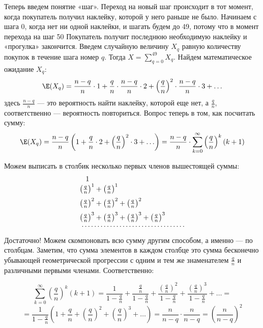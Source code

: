 \begin{enumerate}
Теперь введем понятие «шаг». Переход на новый шаг происходит в тот момент, когда покупатель получил наклейку, которой у него раньше не было. Начинаем с шага 0, когда нет ни одной наклейки, и шагать будем до 49, потому что в момент перехода на шаг 50 Покупатель получит последнюю необходимую наклейку и «прогулка» закончится. Введем случайную величину $X_q$ равную количеству покупок в течение шага номер $q$. Тогда $X = \sum \limits_{q=0}^{49}X_q$.  Найдем математическое ожидание $X_q$:
\[
\E(X_q) = \frac{n-q}{n}\cdot 1 + \frac{q}{n}\cdot\frac{n-q}{n}\cdot 2 + \left(\frac{q}{n}\right)^2\cdot\frac{n-q}{n}\cdot 3 + \ldots
\]
здесь $\frac{n-q}{n}$ —  это вероятность найти наклейку, которой еще нет, а $\frac{q}{n}$, соответственно — вероятность повториться. Вопрос теперь в том, как посчитать сумму:
\[
\E(X_q) = \frac{n-q}{n}\left( 1 + \frac{q}{n}\cdot 2 + \left(\frac{q}{n}\right)^2 \cdot 3 + \ldots\right) = \frac{n-q}{n}\cdot\sum\limits_{k=0}^{\infty}\left(\frac{q}{n}\right)^k(k+1)
\]

Можем выписать в столбик несколько первых членов вышестоящей суммы:
\[
\begin{array}{l}
\hspace{0.3cm}1 \\
\vspace{0.2cm}
\left(\frac{q}{n}\right)^1  + \left(\frac{q}{n}\right)^1  \\
\vspace{0.2cm}
\left(\frac{q}{n}\right)^2 + \left(\frac{q}{n}\right)^2  + \left(\frac{q}{n}\right)^2 \\
\left(\frac{q}{n}\right)^3 + \left(\frac{q}{n}\right)^3 + \left(\frac{q}{n}\right)^3 + \left(\frac{q}{n}\right)^3 \\
\hspace{0.1cm}\cdots\cdots\cdots\cdots\cdots\cdots\cdots\cdots\cdots\cdots\cdots
\end{array}
\]
Достаточно! Можем скомпоновать всю сумму другим способом, а именно — по столбцам. Заметим, что сумма элементов в каждом столбце это сумма бесконечно убывающей геометрической прогрессии с одним и тем же знаменателем $\frac{q}{n}$ и различными первыми членами. Соответственно:

\[
\sum\limits_{k=0}^{\infty}\left(\frac{q}{n}\right)^k(k+1) = \frac{1}{1-\frac{q}{n}} + \frac{\frac{q}{n}}{1-\frac{q}{n}} + \frac{\left(\frac{q}{n}\right)^2}{1-\frac{q}{n}} + \frac{\left(\frac{q}{n}\right)^3}{1-\frac{q}{n}} + \dots =
\]
\[
= \frac{1}{1-\frac{q}{n}}\left( 1 + \frac{q}{n} + \left(\frac{q}{n}\right)^2 + \left(\frac{q}{n}\right)^3 + \dots\right) = \frac{n}{n-q}\cdot\frac{n}{n-q} = \left( \frac{n}{n-q}\right)^2
\]


\end{enumerate}
